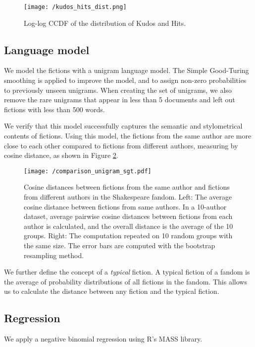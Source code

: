 \documentclass[a4paper]{article}
\begin{document}
\begin{figure}[htbp]
\begin{center}
\texttt{[image: /kudos\_hits\_dist.png]}
\caption{Log-log CCDF of the distribution of Kudos and Hits.}
\label{fig:long_tail}
\end{center}
\end{figure}

\subsection{Language model}
We model the fictions with a unigram language model. The Simple Good-Turing smoothing\cite{gales1995good} is applied to improve the model, and to assign non-zero probabilities to previously unseen unigrams. When creating the set of unigrams, we also remove the rare unigrams that appear in less than 5 documents and left out fictions with less than 500 words.

We verify that this model successfully captures the semantic and stylometrical contents of fictions. Using this model, the fictions from the same author are more close to each other compared to fictions from different authors, measuring by cosine distance, as shown in Figure \ref{fig:comparison_unigram_sgt}.

\begin{figure}[htbp]
\begin{center}
\texttt{[image: /comparison\_unigram\_sgt.pdf]}
\caption{Cosine distances between fictions from the same author and fictions from different authors in the Shakespeare fandom.
Left: The average cosine distance between fictions from same authors. In a 10-author dataset, average pairwise cosine distances between fictions from each author is calculated, and the overall distance is the average of the 10 groups. Right: The computation repeated on 10 random groups with the same size. The error bars are computed with the bootstrap resampling method. }
\label{fig:comparison_unigram_sgt}
\end{center}
\end{figure}

We further define the concept of a \emph{typical} fiction. A typical fiction of a fandom is the average of probability distributions of all fictions in the fandom. This allows us to calculate the distance between any fiction and the typical fiction. 

\subsection{Regression}
We apply a negative binomial regression using R's MASS library. 











    
\end{document}
